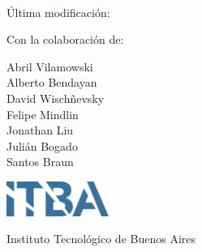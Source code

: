
\begin{titlepage}
\thispagestyle{empty}

\begin{center}
    \vspace*{1cm}
    
    \Huge
    \textbf{\thetitle}
    
    \vspace{0.25cm}
    \large
    \codigomateria \\
    \vspace{0.25cm}
    \Large
    \cuatrimestre

    \vspace{0.25cm}
    \tiny
    Última modificación: \thedate

    
    \vspace{1.5cm}
    
    \normalsize
    \textbf{\theauthor}

    \medskip

    Con la colaboración de:

    Abril Vilamowski%
    \\%
    Alberto Bendayan%
    \\%
    David Wischñevsky%
    \\%
    Felipe Mindlin%
    \\%
    Jonathan Liu%
    \\%
    Julián Bogado%
    \\%
    Santos Braun%
    
    \vfill
    
    \vspace{0.8cm}
    \includegraphics[width=0.25\textwidth]{itba_logo.png}
    
    \vspace{0.8cm}
    
    Instituto Tecnológico de Buenos Aires\\
    
    
\end{center}

\end{titlepage}

\restoregeometry %
